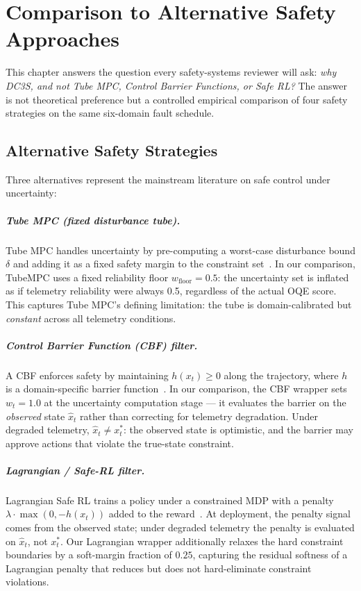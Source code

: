 \chapter{Comparison to Alternative Safety Approaches}
\label{ch:sota-comparison}

This chapter answers the question every safety-systems reviewer will ask:
\emph{why DC3S, and not Tube MPC, Control Barrier Functions, or Safe RL?}
The answer is not theoretical preference but a controlled empirical
comparison of four safety strategies on the same six-domain fault schedule.

\section{Alternative Safety Strategies}

Three alternatives represent the mainstream literature on safe control under
uncertainty:

\paragraph{Tube MPC (fixed disturbance tube).}
Tube MPC handles uncertainty by pre-computing a worst-case disturbance
bound $\delta$ and adding it as a fixed safety margin to the constraint
set~\citep{mayne2005robust}.  In our comparison, TubeMPC uses a fixed
reliability floor $w_{\text{floor}} = 0.5$: the uncertainty set is inflated
as if telemetry reliability were always 0.5, regardless of the actual OQE
score.  This captures Tube MPC's defining limitation: the tube is
domain-calibrated but \emph{constant} across all telemetry conditions.

\paragraph{Control Barrier Function (CBF) filter.}
A CBF enforces safety by maintaining $h(x_t) \ge 0$ along the trajectory,
where $h$ is a domain-specific barrier function~\citep{ames2019control}.
In our comparison, the CBF wrapper sets $w_t = 1.0$ at the uncertainty
computation stage --- it evaluates the barrier on the \emph{observed} state
$\hat{x}_t$ rather than correcting for telemetry degradation.  Under
degraded telemetry, $\hat{x}_t \ne x_t^*$: the observed state is optimistic,
and the barrier may approve actions that violate the true-state constraint.

\paragraph{Lagrangian / Safe-RL filter.}
Lagrangian Safe RL trains a policy under a constrained MDP with a penalty
$\lambda \cdot \max(0, -h(x_t))$ added to the
reward~\citep{garcia2015comprehensive}.  At deployment, the penalty signal
comes from the observed state; under degraded telemetry the penalty is
evaluated on $\hat{x}_t$, not $x_t^*$.  Our Lagrangian wrapper
additionally relaxes the hard constraint boundaries by a soft-margin
fraction of $0.25$, capturing the residual softness of a Lagrangian penalty
that reduces but does not hard-eliminate constraint violations.

